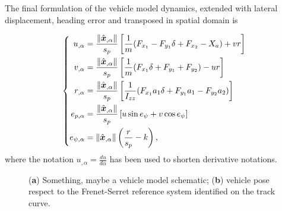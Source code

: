 \documentclass[conference]{IEEEtran} %
\renewcommand{\vec}[1]{\boldsymbol{#1}}
\DeclarePairedDelimiter{\norm}{\lVert}{\rVert}
\begin{document}
The final formulation of the vehicle model dynamics, %
extended with lateral displacement, heading error and transposed in spatial domain is

\begin{equation} \left\{
\begin{aligned}
  u_{,\alpha} &= \frac{\norm{\hat{\vec x}_{,\alpha}}}{s_p} \left[ \frac{1}{m} (F_{x_1} - F_{y_1} \delta + F_{x_2} - X_a) + vr \right] \\
  v_{,\alpha} &= \frac{\norm{\hat{\vec x}_{,\alpha}}}{s_p} \left[ \frac{1}{m} (F_{x_1} \delta + F_{y_1} + F_{y_2}) - ur \right] \\
  r_{,\alpha} &= \frac{\norm{\hat{\vec x}_{,\alpha}}}{s_p} \left[ \frac{1}{I_{zz}} (F_{x_1} a_1 \delta + F_{y_1} a_1 - F_{y_2} a_2) \right] \\
  e_{p,\alpha} &= \frac{\norm{\hat{\vec x}_{,\alpha}}}{s_p} \left[ u \sin{e_\psi} + v \cos{e_\psi} \right] \\
  e_{\psi,\alpha} &= \norm{\hat{\vec x}_{,\alpha}} \left( \frac{r}{s_p} - k \right),
\end{aligned} \right.
\label{eq:vehicle_state_update_alpha_domain}
\end{equation}
%
where the notation $u_{,\alpha} = \frac{du}{d \alpha}$ has been used to shorten derivative notations.

\begin{figure}[htb] \centering
  \quad
  \caption{(\textbf{a}) Something, maybe a vehicle model schematic; (\textbf{b}) vehicle pose respect to the Frenet-Serret reference system identified on the track curve.}
  \label{fig:scheme_frenet_serret}
\end{figure}

\end{document}
